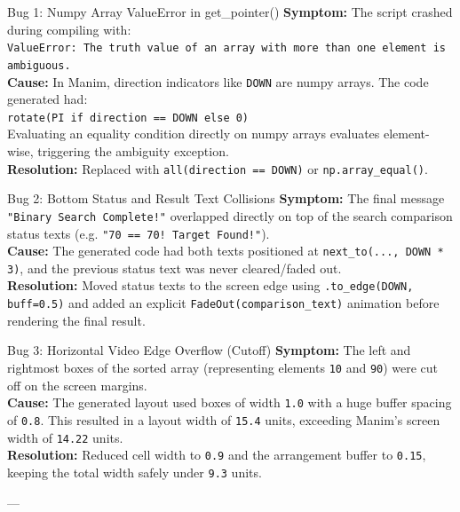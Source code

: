 \documentclass[11pt,a4paper]{article}
\begin{document}
\begin{bugbox}{Bug 1: Numpy Array ValueError in get\_pointer()}
\textbf{Symptom:} The script crashed during compiling with: \\
\texttt{ValueError: The truth value of an array with more than one element is ambiguous.} \\
\textbf{Cause:} In Manim, direction indicators like \texttt{DOWN} are numpy arrays. The code generated had: \\
\texttt{rotate(PI if direction == DOWN else 0)} \\
Evaluating an equality condition directly on numpy arrays evaluates element-wise, triggering the ambiguity exception. \\
\textbf{Resolution:} Replaced with \texttt{all(direction == DOWN)} or \texttt{np.array\_equal()}.
\end{bugbox}

\begin{bugbox}{Bug 2: Bottom Status and Result Text Collisions}
\textbf{Symptom:} The final message \texttt{"Binary Search Complete!"} overlapped directly on top of the search comparison status texts (e.g. \texttt{"70 == 70! Target Found!"}). \\
\textbf{Cause:} The generated code had both texts positioned at \texttt{next\_to(..., DOWN * 3)}, and the previous status text was never cleared/faded out. \\
\textbf{Resolution:} Moved status texts to the screen edge using \texttt{.to\_edge(DOWN, buff=0.5)} and added an explicit \texttt{FadeOut(comparison\_text)} animation before rendering the final result.
\end{bugbox}

\begin{bugbox}{Bug 3: Horizontal Video Edge Overflow (Cutoff)}
\textbf{Symptom:} The left and rightmost boxes of the sorted array (representing elements \texttt{10} and \texttt{90}) were cut off on the screen margins. \\
\textbf{Cause:} The generated layout used boxes of width \texttt{1.0} with a huge buffer spacing of \texttt{0.8}. This resulted in a layout width of \texttt{15.4} units, exceeding Manim's screen width of \texttt{14.22} units. \\
\textbf{Resolution:} Reduced cell width to \texttt{0.9} and the arrangement buffer to \texttt{0.15}, keeping the total width safely under \texttt{9.3} units.
\end{bugbox}

---
\end{document}
